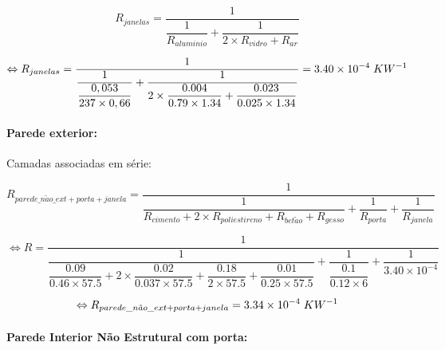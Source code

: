 \documentclass[12pt, a4paper]{article}
\begin{document}
\begin{equation}
	R_{janelas} = \dfrac{1}{\dfrac{1}{R_{aluminio}} + \dfrac{1}{2 \times R_{vidro} + R_{ar}}}
	\label{eq:zona_b_janelas}
\end{equation}

\begin{equation}
	\Leftrightarrow 
	R_{janelas} =
	\dfrac{1}{
		\dfrac{1}{
			\dfrac{0,053}{237 \times 0,66}
		}+
		\dfrac{1}{
			2 \times \dfrac{0.004}{0.79 \times 1.34} +
			\dfrac{0.023}{0.025 \times 1.34}
		}
	}
		= 3.40 \times 10^{-4} \hspace{1mm} KW^{-1}
	\label{eq:zona_b_janelas2}
\end{equation}


\paragraph{Parede exterior:}\label{par:zona_b_ext}Camadas associadas em série:

\begin{equation}
    R_{parede\_n\tilde{a}o\_ext + porta + janela} =
        \dfrac{1}{
			\dfrac{1}{
			R_{cimento} + 2 \times R_{poliestireno} + R_{bet\tilde{a}o} + R_{gesso}
			}  
			+
			\dfrac{1}{
				R_{porta}
			}  
			+
			\dfrac{1}{
				R_{janela}
			}  
		}
    \label{eq:zona_b_ext_1}
\end{equation}

\begin{equation}
    \Leftrightarrow R =
        \dfrac{1}{
			\dfrac{1}{
				\dfrac{0.09}{0.46 \times 57.5} +
				2 \times \dfrac{0.02}{0.037 \times 57.5} +
				\dfrac{0.18}{2 \times 57.5} +
				\dfrac{0.01}{0.25 \times 57.5} 
        	}
			+
			\dfrac{1}{
            	\dfrac{0.1}{0.12 \times 6}
			}
			+
			\dfrac{1}{
            	3.40 \times 10^{-4}
			}
		}
    \label{eq:zona_b_ext_2}
\end{equation}

\begin{equation}
	\Leftrightarrow R_{parede\_n\tilde{a}o\_ext + porta + janela} = 3.34 \times 10^{-4} \hspace{1mm} KW^{-1}
	\label{eq:zona_b_ext_3}
\end{equation}

\paragraph{Parede Interior N\~ao Estrutural com porta:}\label{par:zona_b_int_n_est}
\end{document}
